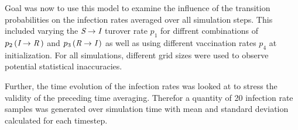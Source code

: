 Goal was now to use this model to examine the influence of the transition probabilities on the infection rates averaged over all simulation steps. This included varying the $\textit{S}\rightarrow\textit{I}$ turover rate $p_1$
for diffrent combinations of $p_2\left(\textit{I}\rightarrow\textit{R}\,\right)$ and $p_3\left(\textit{R}\rightarrow\textit{I}\,\right)$ as well as using different vaccination rates $p_4$ at initialization. 
For all simulations, different grid sizes were used to observe potential statistical inaccuracies.

Further, the time evolution of the infection rates was looked at to stress the validity of the preceding time averaging. Therefor a quantity of 20 infection rate samples was generated over simulation time
with mean and standard deviation calculated for each timestep.